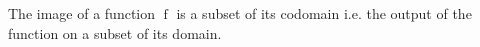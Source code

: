 The image of a function $\operatorname{f}$ is a subset of its codomain i.e. the output of the function on a subset of its domain.
